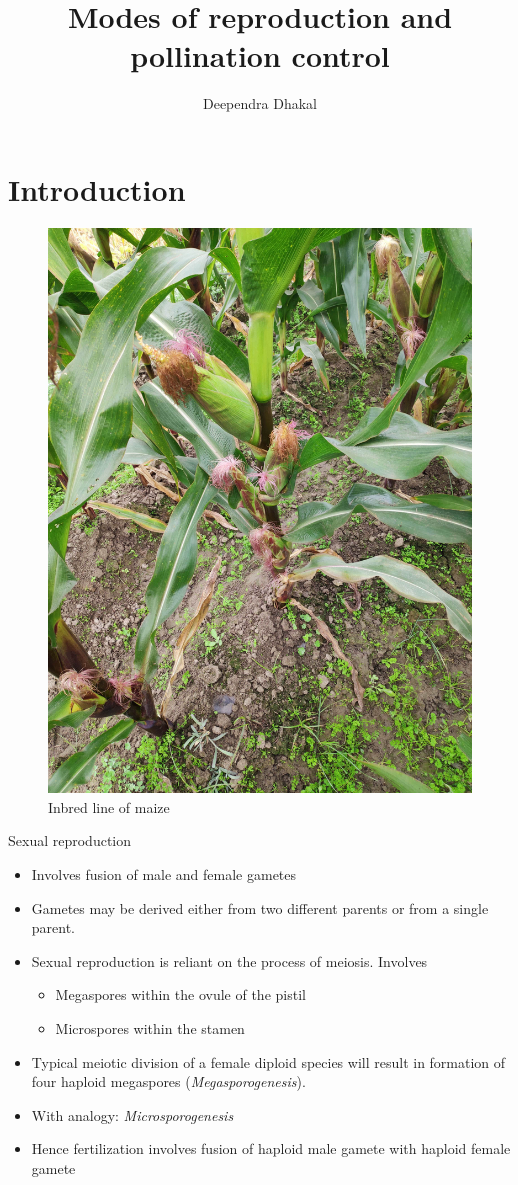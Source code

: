 \documentclass[11pt,ignorenonframetext,aspectratio=169]{beamer}
\title[]{Modes of reproduction and pollination control}
\author[
        Deependra Dhakal
    ]{Deependra Dhakal}
\institute[
    ]{
    Agriculture and Forestry University\\
\textit{ddhakal.rookie@gmail.com}\\
\url{https://rookie.rbind.io}
    }
\date[
      
  ]{
    }
\providecommand{\tightlist}{%
  \setlength{\itemsep}{0pt}\setlength{\parskip}{0pt}}
\begin{document}
  \begin{frame}[plain]
  \titlepage
  \end{frame}



\hypertarget{introduction}{%
\section{Introduction}\label{introduction}}

\begin{frame}{}
\protect\hypertarget{section}{}
\begin{figure}

{\centering \includegraphics[width=0.5\linewidth]{./images/Maize_inbred} 

}

\caption{Inbred line of maize}\label{fig:maize}
\end{figure}
\end{frame}

\begin{frame}{Sexual reproduction}
\protect\hypertarget{sexual-reproduction}{}
\begin{itemize}
\tightlist
\item
  Involves fusion of male and female gametes
\item
  Gametes may be derived either from two different parents or from a
  single parent.
\item
  Sexual reproduction is reliant on the process of meiosis. Involves

  \begin{itemize}
  \tightlist
  \item
    Megaspores within the ovule of the pistil
  \item
    Microspores within the stamen
  \end{itemize}
\item
  Typical meiotic division of a female diploid species will result in
  formation of four haploid megaspores (\emph{Megasporogenesis}).
\item
  With analogy: \emph{Microsporogenesis}
\item
  Hence fertilization involves fusion of haploid male gamete with
  haploid female gamete
\end{itemize}
\end{frame}
\end{document}
